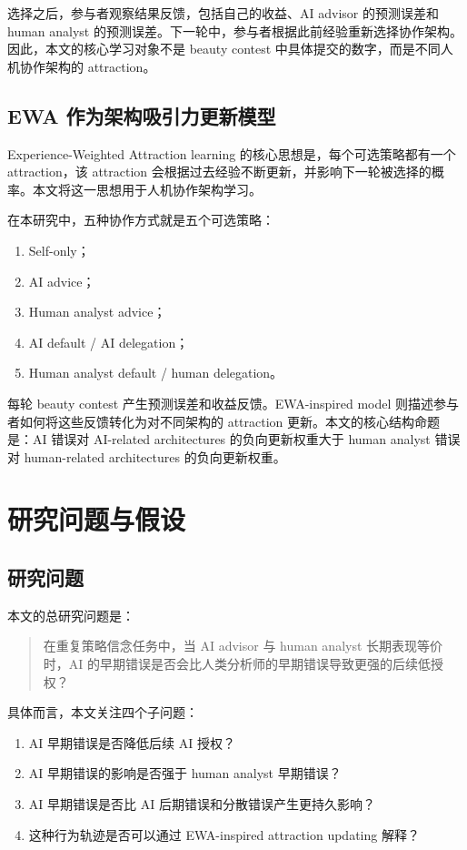 \documentclass[12pt]{article}
\begin{document}
选择之后，参与者观察结果反馈，包括自己的收益、AI advisor 的预测误差和 human analyst 的预测误差。下一轮中，参与者根据此前经验重新选择协作架构。因此，本文的核心学习对象不是 beauty contest 中具体提交的数字，而是不同人机协作架构的 attraction。

\subsection{EWA 作为架构吸引力更新模型}

Experience-Weighted Attraction learning 的核心思想是，每个可选策略都有一个 attraction，该 attraction 会根据过去经验不断更新，并影响下一轮被选择的概率。本文将这一思想用于人机协作架构学习。

在本研究中，五种协作方式就是五个可选策略：
\begin{enumerate}[label=\arabic*.]
    \item Self-only；
    \item AI advice；
    \item Human analyst advice；
    \item AI default / AI delegation；
    \item Human analyst default / human delegation。
\end{enumerate}

每轮 beauty contest 产生预测误差和收益反馈。EWA-inspired model 则描述参与者如何将这些反馈转化为对不同架构的 attraction 更新。本文的核心结构命题是：AI 错误对 AI-related architectures 的负向更新权重大于 human analyst 错误对 human-related architectures 的负向更新权重。

\section{研究问题与假设}

\subsection{研究问题}

本文的总研究问题是：

\begin{quote}
在重复策略信念任务中，当 AI advisor 与 human analyst 长期表现等价时，AI 的早期错误是否会比人类分析师的早期错误导致更强的后续低授权？
\end{quote}

具体而言，本文关注四个子问题：
\begin{enumerate}[label=\arabic*.]
    \item AI 早期错误是否降低后续 AI 授权？
    \item AI 早期错误的影响是否强于 human analyst 早期错误？
    \item AI 早期错误是否比 AI 后期错误和分散错误产生更持久影响？
    \item 这种行为轨迹是否可以通过 EWA-inspired attraction updating 解释？
\end{enumerate}
\end{document}
